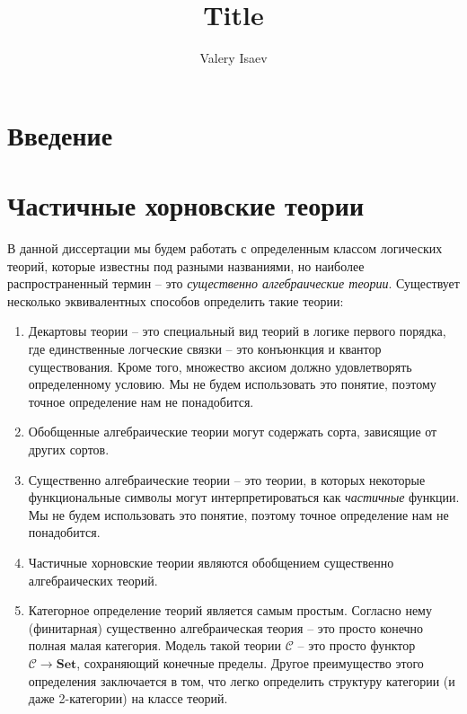 \documentclass[reqno]{amsart}
\theoremstyle{definition}
\theoremstyle{remark}
\newcommand{\bcat}[1]{\mathbf{#1}}
\newcommand{\cat}[1]{\mathcal{#1}}
\newcommand{\Set}{\bcat{Set}}
\begin{document}
\title{Title}

\author{Valery Isaev}

\maketitle

\section{Введение}

\section{Частичные хорновские теории}
\label{sec:pht}

В данной диссертации мы будем работать с определенным классом логических теорий, которые известны под разными названиями, но наиболее распространенный термин -- это \emph{существенно алгебраические теории}.
Существует несколько эквивалентных способов определить такие теории:
\begin{enumerate}
\item Декартовы теории \cite[Definition~D1.3.4]{elephant} -- это специальный вид теорий в логике первого порядка, где единственные логческие связки -- это конъюнкция и квантор существования.
Кроме того, множество аксиом должно удовлетворять определенному условию.
Мы не будем использовать это понятие, поэтому точное определение нам не понадобится.
\item Обобщенные алгебраические теории \cite{GAT} могут содержать сорта, зависящие от других сортов.
\item Существенно алгебраические теории \cite[Definition~3.34]{LPC} -- это теории, в которых некоторые функциональные символы могут интерпретироваться как \emph{частичные} функции.
Мы не будем использовать это понятие, поэтому точное определение нам не понадобится.
\item Частичные хорновские теории \cite{PHL} являются обобщением существенно алгебраических теорий.
\item Категорное определение теорий является самым простым.
Согласно нему (финитарная) существенно алгебраическая теория -- это просто конечно полная малая категория.
Модель такой теории $\cat{C}$ -- это просто функтор $\cat{C} \to \Set$, сохраняющий конечные пределы.
Другое преимущество этого определения заключается в том, что легко определить структуру категории (и даже 2-категории) на классе теорий.
\end{enumerate}
\end{document}
